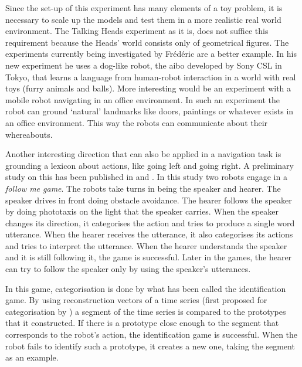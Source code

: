 Since the set-up of this experiment has many elements of a toy problem, it is necessary to scale up the models and test them in a more realistic real world environment. The Talking Heads experiment as it is, does not suffice this requirement because the Heads' world consists only of geometrical figures. The experiments currently being investigated by Fr\'ed\'eric \citet{kaplan:2000} are a better example. In his new experiment he uses a dog-like robot, the {\sc aibo} developed by Sony CSL in Tokyo, that learns a language from human-robot interaction in a world with real toys (furry animals and balls). More interesting would be an experiment with a mobile robot navigating in an office environment. In such an experiment the robot can ground `natural' landmarks like doors, paintings or whatever exists in an office environment. This way the robots can communicate about their whereabouts.

Another interesting direction that can also be applied in a navigation task is grounding a lexicon about actions, like going left and going right. A preliminary study on this has been published in \citet{vogt:1999a} and \citet{vogt:2000}. In this study two robots engage in a {\em follow me game}. The robots take turns in being the speaker and hearer. The speaker drives in front doing obstacle avoidance. The hearer follows the speaker by doing phototaxis on the light that the speaker carries. When the speaker changes its direction, it categorises the action and tries to produce a single word utterance. When the hearer receives the utterance, it also categorises its actions and tries to interpret the utterance. When the hearer understands the speaker and it is still following it, the game is successful. Later in the games, the hearer can try to follow the speaker only by using the speaker's utterances.

In this game, categorisation is done by what has been called the {\sc identification game}. By using reconstruction vectors of a time series (first proposed for categorisation by \citealt{rosenstein:1998a}) a segment of the time series is compared to the prototypes that it constructed. If there is a prototype close enough to the segment that corresponds to the robot's action, the identification game is successful. When the robot fails to identify such a prototype, it creates a new one, taking the segment as an example.

